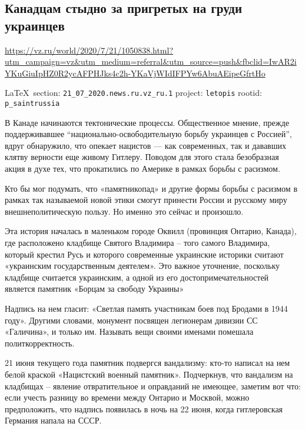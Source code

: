  
 
\subsection{Канадцам стыдно за пригретых на груди украинцев}
\url{https://vz.ru/world/2020/7/21/1050838.html?utm_campaign=vz&utm_medium=referral&utm_source=push&fbclid=IwAR2iYKuGiuIpHZ0R2ycAFPHJks4c2h-YKaVjWIdIFPYw6AbuAEipeGfrtHo}
  
\vspace{0.5cm}
{\small\LaTeX~section: \verb|21_07_2020.news.ru.vz_ru.1| project: \verb|letopis| rootid: \verb|p_saintrussia|}
\vspace{0.5cm}

В Канаде начинаются тектонические процессы. Общественное мнение, прежде
поддерживавшее ``национально-освободительную борьбу украинцев с Россией'', вдруг
обнаружило, что опекает нацистов --- как современных, так и дававших клятву
верности еще живому Гитлеру. Поводом для этого стала безобразная акция в духе
тех, что прокатились по Америке в рамках борьбы с расизмом.

Кто бы мог подумать, что «памятникопад» и другие формы борьбы с расизмом в
рамках так называемой новой этики смогут принести России и русскому миру
внешнеполитическую пользу. Но именно это сейчас и произошло.

Эта история началась в маленьком городе Оквилл (провинция Онтарио, Канада), где
расположено кладбище Святого Владимира – того самого Владимира, который крестил
Русь и которого современные украинские историки считают «украинским
государственным деятелем». Это важное уточнение, поскольку кладбище считается
украинским, а одной из его достопримечательностей является памятник «Борцам за
свободу Украины»

Надпись на нем гласит: «Светлая память участникам боев под Бродами в 1944
году». Другими словами, монумент посвящен легионерам дивизии СС «Галичина», и
только им. Называть вещи своими именами помешала политкорректность.

21 июня текущего года памятник подвергся вандализму: кто-то написал на нем
белой краской «Нацистский военный памятник». Подчеркнув, что вандализм на
кладбищах – явление отвратительное и оправданий не имеющее, заметим вот что:
если учесть разницу во времени между Онтарио и Москвой, можно предположить, что
надпись появилась в ночь на 22 июня, когда гитлеровская Германия напала на
СССР.

